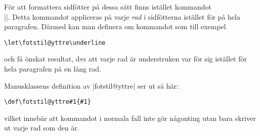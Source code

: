 \documentclass[a4paper,12pt]{article}
\begin{document}
För att formattera sidfötter på dessa sätt finns istället kommandot \\|\fotstil@yttre|. Detta kommandot appliceras på varje \emph{rad} i sidfötterna istället för på hela paragrafen. Därmed kan man definera om kommandot som till exempel
\begin{lstlisting}
\let\fotstil@yttre\underline
\end{lstlisting}
och få önskat resultat, dvs att varje rad är understruken var för sig istället för hela paragrafen på en lång rad.

Manusklassens definition av |fotstil@yttre| ser ut så här:
\begin{lstlisting}
\def\fotstil@yttre#1{#1}
\end{lstlisting}
vilket innebär att kommandot i normala fall inte gör någonting utan bara skriver ut varje rad som den är.



\printindex
\end{document}
